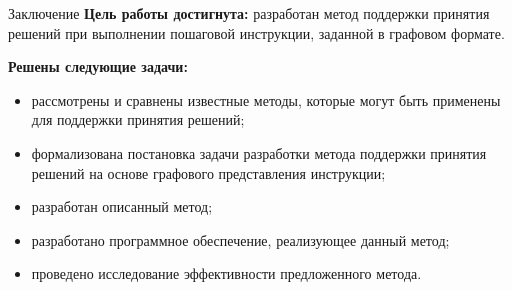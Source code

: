 \documentclass{beamer}
\begin{document}



\begin{frame}{\centering Заключение}
    \textbf{Цель работы достигнута:} разработан метод поддержки принятия решений при выполнении пошаговой инструкции, заданной в графовом формате.
    
    \vfill
    
    \textbf{Решены следующие задачи:}
    \begin{itemize}
        \item[---] рассмотрены и сравнены известные методы, которые могут быть применены для поддержки принятия решений;
        \item[---] формализована постановка задачи разработки метода поддержки принятия решений на основе графового представления инструкции;
        \item[---] разработан описанный метод;
        \item[---] разработано программное обеспечение, реализующее данный метод;
        \item[---] проведено исследование эффективности предложенного метода.
    \end{itemize}
\end{frame}

\end{document}
